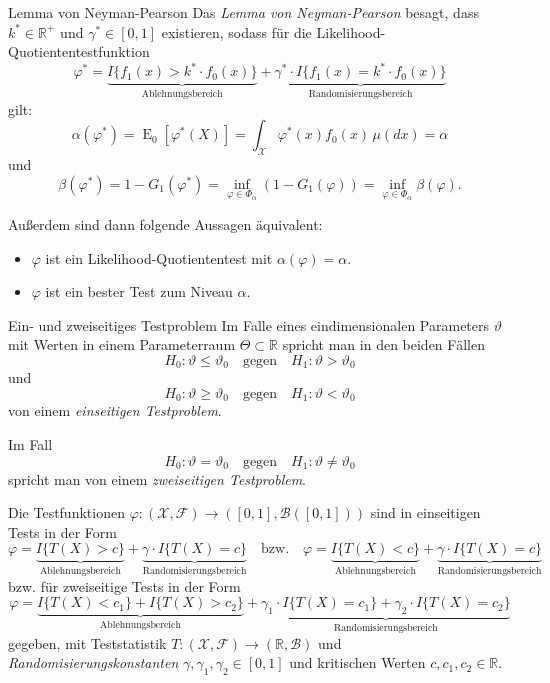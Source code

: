 \begin{theo}{Lemma von Neyman-Pearson}
    Das \emph{Lemma von Neyman-Pearson} besagt, dass $k^* \in \mathbb{R}^+$ und $\gamma^* \in [0, 1]$ existieren, sodass für die Likelihood-Quotiententestfunktion
    \[
        \varphi^* = \underbrace{I \{ f_1(x) > k^* \cdot f_0(x) \}}_{\text{Ablehnungsbereich}} + \underbrace{\gamma^* \cdot I \{ f_1(x) = k^* \cdot f_0(x) \}}_{\text{Randomisierungsbereich}}
    \]
    gilt:
    \[
        \alpha(\varphi^*) = \operatorname{E}_{0}[\varphi^*(X)] = \int_{\mathcal{X}} \varphi^*(x) f_0(x) \, \mu(dx) = \alpha
    \]
    und
    \[
        \beta(\varphi^*) = 1 - G_{1}(\varphi^*) = \inf_{\varphi \in \Phi_{\alpha}} (1 - G_{1}(\varphi)) = \inf_{\varphi \in \Phi_{\alpha}} \beta(\varphi).
    \]

    Außerdem sind dann folgende Aussagen äquivalent:
    \begin{itemize}
        \item $\varphi$ ist ein Likelihood-Quotiententest mit $\alpha(\varphi) = \alpha$.
        \item $\varphi$ ist ein bester Test zum Niveau $\alpha$.
    \end{itemize}
\end{theo}

\begin{defi}{Ein- und zweiseitiges Testproblem}
    Im Falle eines eindimensionalen Parameters $\vartheta$ mit Werten in einem Parameterraum $\Theta \subset \mathbb{R}$ spricht man in den beiden Fällen
    \[
        H_0 : \vartheta \leq \vartheta_0 \quad \text{gegen} \quad H_1 : \vartheta > \vartheta_0
    \]
    und
    \[
        H_0 : \vartheta \geq \vartheta_0 \quad \text{gegen} \quad H_1 : \vartheta < \vartheta_0
    \]
    von einem \emph{einseitigen Testproblem}.

    Im Fall
    \[
        H_0 : \vartheta = \vartheta_0 \quad \text{gegen} \quad H_1 : \vartheta \neq \vartheta_0
    \]
    spricht man von einem \emph{zweiseitigen Testproblem}.

    Die Testfunktionen $\varphi: (\mathcal{X}, \mathcal{F}) \to ([0, 1], \mathcal{B}([0, 1]))$ sind in einseitigen Tests in der Form
    \[
        \varphi = \underbrace{I \{ T(X) > c \}}_{\text{Ablehnungsbereich}} + \underbrace{\gamma \cdot I \{ T(X) = c \}}_{\text{Randomisierungsbereich}} \quad \text{bzw.} \quad \varphi = \underbrace{I \{ T(X) < c \}}_{\text{Ablehnungsbereich}} + \underbrace{\gamma \cdot I \{ T(X) = c \}}_{\text{Randomisierungsbereich}}
    \]
    bzw. für zweiseitige Tests in der Form
    \[
        \varphi = \underbrace{I \{ T(X) < c_1 \} + I \{ T(X) > c_2 \}}_{\text{Ablehnungsbereich}} + \underbrace{\gamma_1 \cdot I \{ T(X) = c_1 \} + \gamma_2 \cdot I \{ T(X) = c_2 \}}_{\text{Randomisierungsbereich}}
    \]
    gegeben, mit Teststatistik $T: (\mathcal{X}, \mathcal{F}) \to (\mathbb{R}, \mathcal{B})$ und \emph{Randomisierungskonstanten} $\gamma, \gamma_1, \gamma_2 \in [0, 1]$ und kritischen Werten $c, c_1, c_2 \in \mathbb{R}$.
\end{defi}

